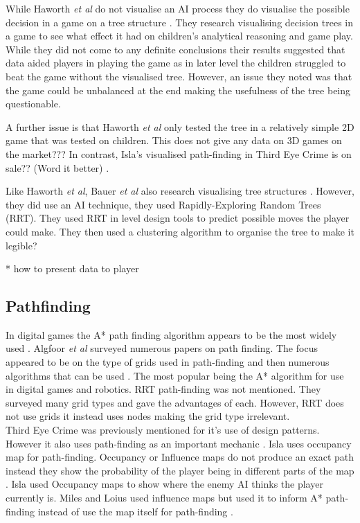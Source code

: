 \documentclass[journal]{IEEEtran}
\begin{document}
While Haworth \textit{et al} do not visualise an AI process they do visualise the possible decision in a game on a tree structure \cite{Haworth2010}. They research visualising decision trees in a game to see what effect it had on children's analytical reasoning and game play.  While they did not come to any definite conclusions their results suggested that data aided players in playing the game as in later level the children struggled to beat the game without the visualised tree. However, an issue they noted was that the game could be unbalanced at the end making the usefulness of the tree being questionable.  

A further issue is that Haworth \textit{et al} only tested the tree in a relatively simple 2D game that was tested on children. This does not give any data on 3D games on the market??? In contrast, Isla's visualised path-finding in Third Eye Crime is on sale?? (Word it better) \cite{Isla2014}.
 
Like  Haworth \textit{et al}, Bauer \textit{et al} also research visualising tree structures \cite{bauer2012}. However, they did use an AI technique, they used Rapidly-Exploring Random Trees (RRT). They used RRT in level design tools to predict possible moves the player could make.  They then used a clustering algorithm to organise the tree to make it legible? 

* how to present data to player 


\subsection{Pathfinding}
In digital games the A* path finding algorithm appears to be the most widely used \cite{Algfoor2015}.  Algfoor \textit{et al} surveyed numerous papers on path finding. The focus appeared to be on the type of grids used in path-finding and then numerous algorithms that can be used \cite{Algfoor2015}. The most popular being the A* algorithm for use in digital games and robotics. RRT path-finding was not mentioned. 
They surveyed many grid types and gave the advantages of each. However, RRT does not use grids it instead uses nodes making the grid type irrelevant.\\

Third Eye Crime was previously mentioned for it's use of design patterns. However it also uses path-finding as an important mechanic \cite{Isla2014}. Isla uses occupancy map for path-finding. Occupancy or Influence maps do not produce an exact path instead they show the probability of the player being in different parts of the map \cite{Isla2014, Miles2006}. Isla used Occupancy maps to show where the enemy AI thinks the player currently is. Miles and Loius used influence maps but used it to inform A* path-finding instead of use the map itself for path-finding \cite{Miles2006}.\\
 
\end{document}
